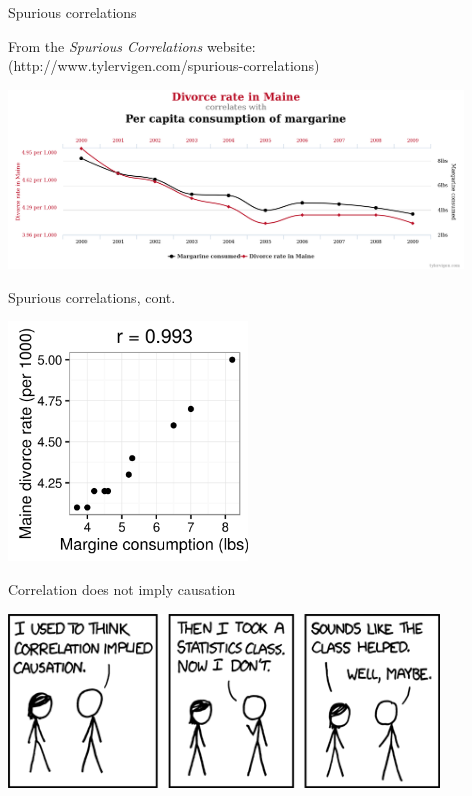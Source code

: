 \documentclass[xcolor=table]{beamer}
\begin{document}
\begin{frame}{Spurious correlations}
\begin{block}{}
\small
From the \emph{Spurious Correlations} website:\\ (http://www.tylervigen.com/spurious-correlations)
\end{block}
\bigskip
{\centering
\includegraphics[width=4.75in]{../images/ch10_cor_spur}
\par}

\end{frame}

\begin{frame}{Spurious correlations, cont.}
\bigskip
{\centering
\includegraphics[width=2.5in]{../images/ch10_cor_spur2}
\par}

\end{frame}


\begin{frame}{Correlation does not imply causation}

{\centering
\includegraphics[width=4.5in]{../images/ch10_correlation}
\par}
\end{frame}
\end{document}
